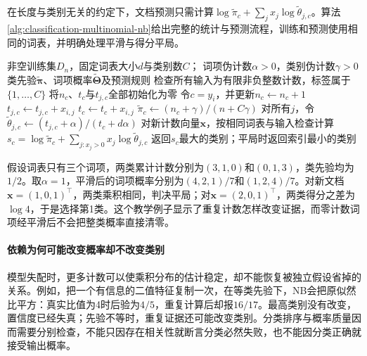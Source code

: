 在长度与类别无关的约定下，文档预测只需计算$\log\tilde\pi_c+\sum_jx_j\log\tilde\theta_{j,c}$。算法\ref{alg:classification-multinomial-nb}给出完整的统计与预测流程，训练和预测使用相同的词表，并明确处理平滑与得分平局。
\begin{algorithm}[带平滑的多项式朴素贝叶斯]
  \label{alg:classification-multinomial-nb}
  \begin{algorithmic}[1]
    \Require 非空训练集$D_n$，固定词表大小$d$与类别数$C$；
    \Statex \hspace{\algorithmicindent} 词项伪计数$\alpha>0$，类别伪计数$\gamma>0$
    \Ensure 类先验$\tilde{\bm{\pi}}$、词项概率$\tilde{\bm{\Theta}}$及预测规则
    \State 检查所有输入为有限非负整数计数，标签属于$\{1,\ldots,C\}$
    \State 将$n_c$、$t_c$与$t_{j,c}$全部初始化为零
      \State 令$c=y_i$，并更新$n_c\gets n_c+1$
        \State $t_{j,c}\gets t_{j,c}+x_{i,j}$
        \State $t_c\gets t_c+x_{i,j}$
      \EndFor
    \EndFor
      \State $\tilde\pi_c\gets(n_c+\gamma)/(n+C\gamma)$
      \State 对所有$j$，令$\tilde\theta_{j,c}\gets(t_{j,c}+\alpha)/(t_c+d\alpha)$
    \EndFor
    \State 对新计数向量$\bm{x}$，按相同词表与输入检查计算
    \Statex \hspace{\algorithmicindent}
      $s_c=\log\tilde\pi_c+\sum_{j:x_j>0}x_j\log\tilde\theta_{j,c}$
    \State 返回$s_c$最大的类别；平局时返回索引最小的类别
  \end{algorithmic}
\end{algorithm}

假设词表只有三个词项，两类累计计数分别为$(3,1,0)$和$(0,1,3)$，类先验均为$1/2$。取$\alpha=1$，平滑后的词项概率分别为$(4,2,1)/7$和$(1,2,4)/7$。对新文档$\bm{x}=(1,0,1)^{\top}$，两类乘积相同，判决平局；对$\bm{x}=(2,0,1)^{\top}$，两类得分之差为$\log4$，于是选择第1类。这个教学例子显示了重复计数怎样改变证据，而零计数词项经平滑后不会把整类概率直接清零。

\paragraph{依赖为何可能改变概率却不改变类别}
\label{sec:classification-naive-bayes-theory}
模型失配时，更多计数可以使乘积分布的估计稳定，却不能恢复被独立假设省掉的关系。例如，把一个有信息的二值特征复制一次，在等类先验下，NB会把原似然比平方：真实比值为4时后验为$4/5$，重复计算后却报$16/17$。最高类别没有改变，置信度已经失真；先验不等时，重复证据还可能改变类别。分类排序与概率质量因而需要分别检查，不能只因存在相关性就断言分类必然失败，也不能因分类正确就接受输出概率。

